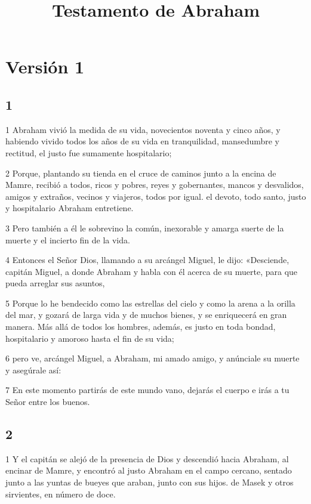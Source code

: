 

\title{Testamento de Abraham}

\part{Versión 1}

\chapter{1}

\par 1 Abraham vivió la medida de su vida, novecientos noventa y cinco años, y habiendo vivido todos los años de su vida en tranquilidad, mansedumbre y rectitud, el justo fue sumamente hospitalario;

\par 2 Porque, plantando su tienda en el cruce de caminos junto a la encina de Mamre, recibió a todos, ricos y pobres, reyes y gobernantes, mancos y desvalidos, amigos y extraños, vecinos y viajeros, todos por igual. el devoto, todo santo, justo y hospitalario Abraham entretiene.

\par 3 Pero también a él le sobrevino la común, inexorable y amarga suerte de la muerte y el incierto fin de la vida.

\par 4 Entonces el Señor Dios, llamando a su arcángel Miguel, le dijo: «Desciende, capitán Miguel, a donde Abraham y habla con él acerca de su muerte, para que pueda arreglar sus asuntos,

\par 5 Porque lo he bendecido como las estrellas del cielo y como la arena a la orilla del mar, y gozará de larga vida y de muchos bienes, y se enriquecerá en gran manera. Más allá de todos los hombres, además, es justo en toda bondad, hospitalario y amoroso hasta el fin de su vida;

\par 6 pero ve, arcángel Miguel, a Abraham, mi amado amigo, y anúnciale su muerte y asegúrale así:

\par 7 En este momento partirás de este mundo vano, dejarás el cuerpo e irás a tu Señor entre los buenos.

\chapter{2}

\par 1 Y el capitán se alejó de la presencia de Dios y descendió hacia Abraham, al encinar de Mamre, y encontró al justo Abraham en el campo cercano, sentado junto a las yuntas de bueyes que araban, junto con sus hijos. de Masek y otros sirvientes, en número de doce.

